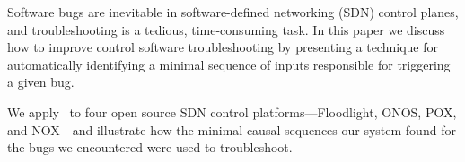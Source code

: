Software bugs are inevitable in software-defined networking (SDN) control planes,
and troubleshooting
is a tedious, time-consuming task.
In this paper we discuss how to improve
control software troubleshooting by presenting a technique
for automatically identifying
a minimal sequence of inputs responsible for triggering a given bug.

We apply \simulator~to \num{four} open source SDN control
platforms---Floodlight, ONOS, POX, and NOX---and
illustrate how the minimal causal sequences our system found for the bugs we
encountered were used to troubleshoot.
